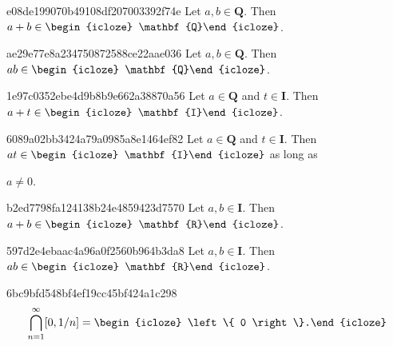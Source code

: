 \begin{note}{e08de199070b49108df207003392f74e}
    Let \({ a, b \in \mathbf{Q} }\).
    Then \({ a + b \in \begin{icloze}{1}\mathbf{Q}\end{icloze} }\).
\end{note}

\begin{note}{ae29e77e8a234750872588ce22aae036}
    Let \({ a, b \in \mathbf{Q} }\).
    Then \({ ab \in \begin{icloze}{1}\mathbf{Q}\end{icloze} }\).
\end{note}

\begin{note}{1e97c0352ebe4d9b8b9e662a38870a56}
    Let \({ a \in \mathbf{Q} }\) and \({ t \in \mathbf{I} }\).
    Then \({ a + t \in \begin{icloze}{1}\mathbf{I}\end{icloze} }\).
\end{note}

\begin{note}{6089a02bb3424a79a0985a8e1464ef82}
    Let \({ a \in \mathbf{Q} }\) and \({ t \in \mathbf{I} }\).
    Then \({ at \in \begin{icloze}{1}\mathbf{I}\end{icloze} }\) as long as \begin{icloze}{2}\({ a \neq 0 }\).\end{icloze}
\end{note}

\begin{note}{b2ed7798fa124138b24e4859423d7570}
    Let \({ a, b \in \mathbf{I} }\).
    Then \({ a + b \in \begin{icloze}{1}\mathbf{R}\end{icloze} }\).
\end{note}

\begin{note}{597d2e4ebaac4a96a0f2560b964b3da8}
    Let \({ a, b \in \mathbf{I} }\).
    Then \({ ab \in \begin{icloze}{1}\mathbf{R}\end{icloze} }\).
\end{note}

\begin{note}{6bc9bfd548bf4ef19cc45bf424a1c298}
    \[
        \bigcap_{n = 1}^{\infty} [0, 1/n] = \begin{icloze}{1}\left\{ 0 \right\}.\end{icloze}
    \]
\end{note}

